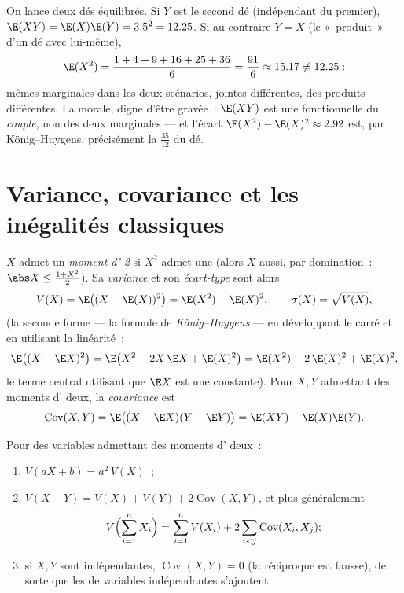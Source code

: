 \begin{example}\label{ex:b2:randomvar:productcontrast}
On lance deux dés équilibrés. Si $Y$ est le second dé (indépendant du
premier), $\E(XY) = \E(X)\E(Y) = 3.5^2 = 12.25$. Si au contraire
$Y = X$ (le «~produit~» d'un dé avec lui-même),
\[
\E(X^2) = \frac{1 + 4 + 9 + 16 + 25 + 36}{6} = \frac{91}{6}
\approx 15.17 \neq 12.25 :
\]
mêmes  marginales dans les deux scénarios,  jointes
différentes,  des produits différentes. La morale, digne
d'être gravée~: $\E(XY)$ est une fonctionnelle du \emph{couple}, non
des deux marginales --- et l'écart $\E(X^2) - \E(X)^2 \approx 2.92$
est, par König--Huygens, précisément la 
$\frac{35}{12}$ du dé.
\end{example}

\section{Variance, covariance et les inégalités classiques}

\begin{definition}\label{def:b2:randomvar:variance}
$X$ admet un \emph{moment d' 2} si $X^2$ admet une 
(alors $X$ aussi, par domination~: $\abs X \leq \frac{1 +
X^2}{2}$). Sa \emph{variance} et son \emph{écart-type} sont
alors
\[
V(X) = \E\bigl((X - \E(X))^2\bigr)
= \E(X^2) - \E(X)^2 ,
\qquad
\sigma(X) = \sqrt{V(X)} ,
\]
(la seconde forme --- la formule de \emph{König--Huygens} --- en
développant le carré et en utilisant la linéarité~:
\[
\E\bigl((X - \E X)^2\bigr)
= \E\bigl(X^2 - 2X\,\E X + \E(X)^2\bigr)
= \E(X^2) - 2\,\E(X)^2 + \E(X)^2 ,
\]
le terme central utilisant que $\E X$ est une constante). Pour $X, Y$
admettant des moments d' deux, la \emph{covariance} est
\[
\operatorname{Cov}(X, Y)
= \E\bigl((X - \E X)(Y - \E Y)\bigr)
= \E(XY) - \E(X)\E(Y) .
\]
\end{definition}

\begin{theorem}\label{thm:b2:randomvar:variancerules}
Pour des variables admettant des moments d' deux~:
\begin{enumerate}
\item $V(aX + b) = a^2\,V(X)$~;
\item $V(X + Y) = V(X) + V(Y) + 2\operatorname{Cov}(X, Y)$, et
plus généralement
\[
V\Bigl(\sum_{i=1}^n X_i\Bigr)
= \sum_{i=1}^n V(X_i)
+ 2\sum_{i < j}\operatorname{Cov}(X_i, X_j) ;
\]
\item si $X, Y$ sont indépendantes, $\operatorname{Cov}(X, Y) = 0$
(la réciproque est fausse), de sorte que les  de variables
indépendantes s'ajoutent.
\end{enumerate}
\end{theorem}

